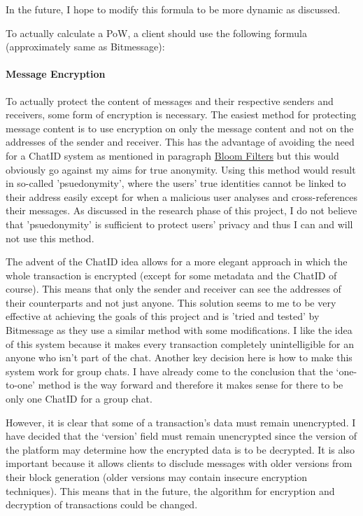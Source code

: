 \documentclass{article}
\begin{document}
In the future, I hope to modify this formula to be more dynamic as discussed.

To actually calculate a PoW, a client should use the following formula (approximately same as Bitmessage):


\paragraph{Message Encryption}
To actually protect the content of messages and their respective senders and receivers, some form of encryption is necessary. The easiest method for protecting message content is to use encryption on only the message content and not on the addresses of the sender and receiver. This has the advantage of avoiding the need for a ChatID system as mentioned in paragraph \href{para:bf}{Bloom Filters} but this would obviously go against my aims for true anonymity. Using this method would result in so-called 'psuedonymity', where the users' true identities cannot be linked to their address easily except for when a malicious user analyses and cross-references their messages. As discussed in the research phase of this project, I do not believe that 'psuedonymity' is sufficient to protect users' privacy and thus I can and will not use this method.

The advent of the ChatID idea allows for a more elegant approach in which the whole transaction is encrypted (except for some metadata and the ChatID of course). This means that only the sender and receiver can see the addresses of their counterparts and not just anyone. This solution seems to me to be very effective at achieving the goals of this project and is 'tried and tested' by Bitmessage as they use a similar method with some modifications. I like the idea of this system because it makes every transaction completely unintelligible for an anyone who isn't part of the chat. Another key decision here is how to make this system work for group chats. I have already come to the conclusion that the `one-to-one' method is the way forward and therefore it makes sense for there to be only one ChatID for a group chat.

However, it is clear that some of a transaction's data must remain unencrypted. I have decided that the `version' field must remain unencrypted since the version of the platform may determine how the encrypted data is to be decrypted. It is also important because it allows clients to disclude messages with older versions from their block generation (older versions may contain insecure encryption techniques). This means that in the future, the algorithm for encryption and decryption of transactions could be changed.
\end{document}
